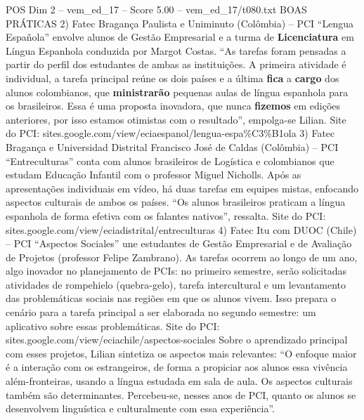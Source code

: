 \begin{textsample}{POS Dim 2 – vem\_ed\_17 – Score 5.00 – vem\_ed\_17/t080.txt}  \label{ex:f2_pos_124}
BOAS PRÁTICAS 2) Fatec Bragança Paulista e Uniminuto (Colômbia) – PCI “Lengua Española” envolve alunos de Gestão Empresarial e a turma de \textbf{Licenciatura} em Língua Espanhola conduzida por Margot Costas. “As tarefas foram pensadas a partir do perfil dos estudantes de ambas as instituições.
A primeira atividade é individual, a tarefa principal reúne os dois países e a última \textbf{fica} a \textbf{cargo} dos alunos colombianos, que \textbf{ministrarão} pequenas aulas de língua espanhola para os brasileiros.
Essa é uma proposta inovadora, que nunca \textbf{fizemos} em edições anteriores, por isso estamos otimistas com o resultado”, empolga-se Lilian.
Site do PCI: sites.google.com/view/eciaespanol/lengua-espa\%C3\%B1ola 3) Fatec Bragança e Universidad Distrital Francisco José de Caldas (Colômbia) – PCI “Entreculturas” conta com alunos brasileiros de Logística e colombianos que estudam Educação Infantil com o professor Miguel Nicholls.
Após as apresentações individuais em vídeo, há duas tarefas em equipes mistas, enfocando aspectos culturais de ambos os países. “Os alunos brasileiros praticam a língua espanhola de forma efetiva com os falantes nativos”, ressalta.
Site do PCI: sites.google.com/view/eciadistrital/entreculturas 4) Fatec Itu com DUOC (Chile) – PCI “Aspectos Sociales” une estudantes de Gestão Empresarial e de Avaliação de Projetos (professor Felipe Zambrano).
As tarefas ocorrem ao longo de um ano, algo inovador no planejamento de PCIs: no primeiro semestre, serão solicitadas atividades de rompehielo (quebra-gelo), tarefa intercultural e um levantamento das problemáticas sociais nas regiões em que os alunos vivem.
Isso prepara o cenário para a tarefa principal a ser elaborada no segundo semestre: um aplicativo sobre essas problemáticas.
Site do PCI: sites.google.com/view/eciachile/aspectos-sociales Sobre o aprendizado principal com esses projetos, Lilian sintetiza os aspectos mais relevantes: “O enfoque maior é a interação com os estrangeiros, de forma a propiciar aos alunos essa vivência além-fronteiras, usando a língua estudada em sala de aula.
Os aspectos culturais também são determinantes.
Percebeu-se, nesses anos de PCI, quanto os alunos se desenvolvem linguística e culturalmente com essa experiência”.

\end{textsample}

